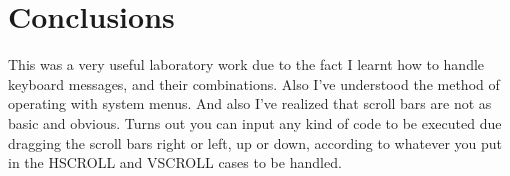 \section*{Conclusions}

This was a very useful laboratory work due to the fact I learnt how to handle keyboard messages, and their combinations. Also I've understood the method of operating with system menus.
And also I've realized that scroll bars are not as basic and obvious. Turns out you can input any kind of code to be executed due dragging the scroll bars right or left, up or down, according to whatever you put in the HSCROLL and VSCROLL cases to be handled.

\clearpage